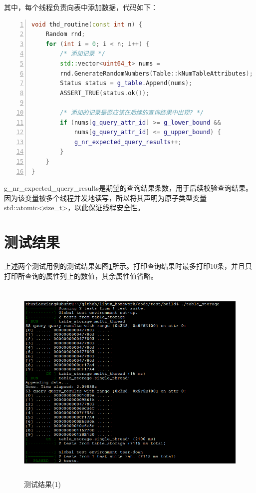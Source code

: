\documentclass[bachelor]{thesis-uestc}
\begin{document}
其中，每个线程负责向表中添加数据，代码如下：

\begin{lstlisting}[language=C++, basicstyle=\ttfamily\tiny, numbers=left, numberstyle=\tiny, keywordstyle=\color{blue!70}, commentstyle=\color{red!50!green!50!blue!50}, frame=shadowbox, rulesepcolor=\color{red!20!green!20!blue!20}]
void thd_routine(const int n) {
	Random rnd;
	for (int i = 0; i < n; i++) {
		/* 添加记录 */
		std::vector<uint64_t> nums =
		rnd.GenerateRandomNumbers(Table::kNumTableAttributes);
		Status status = g_table.Append(nums);
		ASSERT_TRUE(status.ok());
		
		/* 添加的记录是否应该在后续的查询结果中出现? */
		if (nums[g_query_attr_id] >= g_lower_bound &&
			nums[g_query_attr_id] <= g_upper_bound) {
			g_nr_expected_query_results++;
		}
	}
}
\end{lstlisting}

g\_nr\_expected\_query\_results是期望的查询结果条数，用于后续校验查询结果。因为该变量被多个线程并发地读写，所以将其声明为原子类型变量std::atomic<size\_t>，以此保证线程安全性。

\section{测试结果}
上述两个测试用例的测试结果如图\ref{fig:test_linux}所示。打印查询结果时最多打印10条，并且只打印所查询的属性列上的数值，其余属性值省略。
\begin{figure}[htbp]
	\centering\includegraphics[height=10cm]{images/test_linux.png}
	\caption{测试结果(1)}
	\label{fig:test_linux}
\end{figure}
\end{document}

